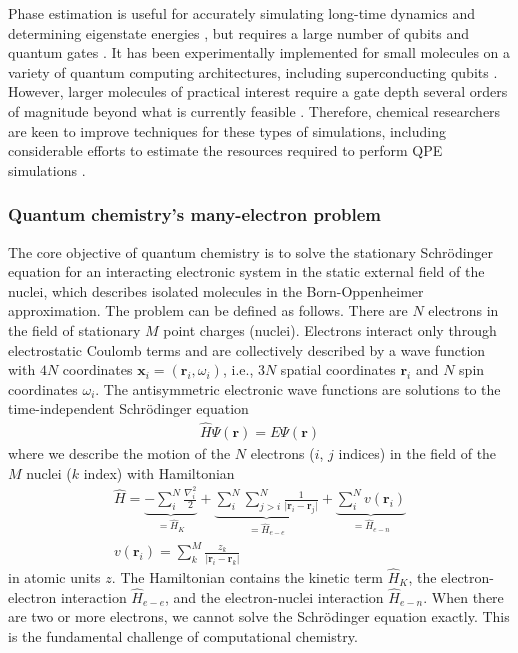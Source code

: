 \documentclass[10pt]{iopart}
\begin{document}
Phase estimation is useful for accurately simulating long-time dynamics and determining eigenstate energies \cite{Kitaev1996}, but requires a large number of qubits and quantum gates \cite{Wecker2014,Babbush2018}. It has been experimentally implemented for small molecules on a variety of quantum computing architectures, including superconducting qubits \cite{OMalley2016}. However, larger molecules of practical interest require a gate depth several orders of magnitude beyond what is currently feasible \cite{Reiher2017}. Therefore, chemical researchers are keen to improve techniques for these types of simulations, including considerable efforts to estimate the resources required to perform QPE simulations \cite{Babbush2018}.

\subsubsection{Quantum chemistry's many-electron problem}\hfill

The core objective of quantum chemistry is to solve the stationary Schr{\"o}dinger equation for an interacting electronic system in the static external field of the nuclei, which describes isolated molecules in the Born-Oppenheimer approximation. The problem can be defined as follows. There are $N$ electrons in the field of stationary $M$ point charges (nuclei). Electrons interact only through electrostatic Coulomb terms and are collectively described by a wave function with $4N$ coordinates $\mathbf{x}_i = (\mathbf{r}_i, \omega_i)$, i.e., $3N$ spatial coordinates $\mathbf{r}_i$ and $N$ spin coordinates $\omega_i$. The antisymmetric electronic wave functions are  solutions to the time-independent Schr{\"o}dinger equation
\begin{gather}
\hat{H} \Psi(\mathbf{r}) = E \Psi(\mathbf{r})
\end{gather}
where we describe the motion of the $N$ electrons ($i$, $j$ indices) in the field of the $M$ nuclei ($k$ index) with Hamiltonian
\begin{gather}
\hat{H} = 
\underbrace{- \sum_i^N \frac{\nabla_i^2}{2}}_{=\hat{H}_K} 
+ \underbrace{\sum_i^N \sum_{j>i}^N \frac{1}{\vert\mathbf{r}_i-\mathbf{r}_j\vert}}_{=\hat{H}_{e-e}}
+ \underbrace{\sum_i^N v(\mathbf{r}_i)}_{=\hat{H}_{e-n}} \\
v(\mathbf{r}_i) = \sum_k^M \frac{z_k}{\vert\mathbf{r}_i-\mathbf{r}_k\vert}
\label{schroedinger_equation}
\end{gather}
in atomic units $z$. The Hamiltonian contains the kinetic term $\hat{H}_K$, the electron-electron interaction $\hat{H}_{e-e}$, and the electron-nuclei interaction $\hat{H}_{e-n}$. When there are two or more electrons, we cannot solve the Schr{\"o}dinger equation exactly. This is the fundamental challenge of computational chemistry.
\end{document}
